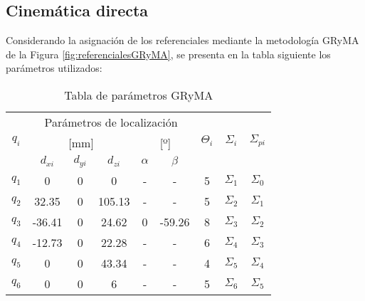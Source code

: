 \subsection{Cinemática directa}
    \noindent Considerando la asignación de los referenciales mediante la metodología GRyMA de la Figura \ref{fig:referencialesGRyMA},
    se presenta en la tabla siguiente los parámetros utilizados:

    \begin{table}[H]
        \centering
        \begin{center}
        \caption{Tabla de parámetros GRyMA}
            \begin{tabular}{c||ccc|cc|c|c|c}
                \multirow{3}{*}{$q_i$} & \multicolumn{5}{c|}{Parámetros de localización}               & \multirow{3}{*}{$\Theta_i$} & \multirow{3}{*}{$\Sigma_i$} & \multirow{3}{*}{$\Sigma_{pi}$} \\
                                       & \multicolumn{3}{c|}{{[}mm{]}}  & \multicolumn{2}{c|}{{[}º{]}} &                             &                             &                                \\
                                       & $d_{xi}$ & $d_{yi}$ & $d_{zi}$ & $\alpha$      & $\beta$      &                             &                             &                                \\ \hline \hline
                $q_1$                  & 0        & 0        & 0        & -             & -            & 5                           & $\Sigma_1$                  & $\Sigma_0$                     \\
                $q_2$                  & 32.35    & 0        & 105.13   & -             & -            & 5                           & $\Sigma_2$                  & $\Sigma_1$                     \\
                $q_3$                  & -36.41   & 0        & 24.62    & 0            & -59.26      & 8                           & $\Sigma_3$                  & $\Sigma_2$                     \\
                $q_4$                  & -12.73   & 0        & 22.28    & -             & -            & 6                           & $\Sigma_4$                  & $\Sigma_3$                     \\
                $q_5$                  & 0        & 0        & 43.34    & -             & -            & 4                           & $\Sigma_5$                  & $\Sigma_4$                     \\
                $q_6$                  & 0        & 0        & 6        & -             & -            & 5                           & $\Sigma_6$                  & $\Sigma_5$                    
            \end{tabular}
        \end{center}
    \end{table}


